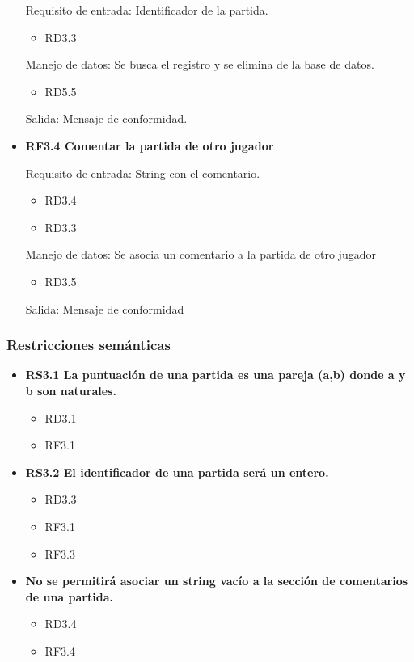 \begin{itemize}
	Requisito de entrada: Identificador de la partida.
	\begin{itemize}
		\item RD3.3
	\end{itemize}

	Manejo de datos: Se busca el registro y se elimina de la base de datos. \\
	\begin{itemize}
		\item RD5.5
	\end{itemize}

	Salida: Mensaje de conformidad. \\

	\item \textbf{RF3.4 Comentar la partida de otro jugador}

	Requisito de entrada: String con el comentario.
	\begin{itemize}
		\item RD3.4
		\item RD3.3
	\end{itemize}

	Manejo de datos: Se asocia un comentario a la partida de otro jugador
	\begin{itemize}
		\item RD3.5
	\end{itemize}

	Salida: Mensaje de conformidad \\

\end{itemize}

	\subsubsection{Restricciones semánticas}

	\begin{itemize}
		\item \textbf{RS3.1 La puntuación de una partida es una pareja (a,b) donde a y b son naturales.}
			\begin{itemize}
				\item RD3.1
				\item RF3.1
			\end{itemize}
		\item \textbf{RS3.2 El identificador de una partida será un entero.}
			\begin{itemize}
				\item RD3.3
				\item RF3.1
				\item RF3.3
			\end{itemize}

		\item \textbf{No se permitirá asociar un string vacío a la sección de comentarios de una partida.}
		\begin{itemize}
			\item RD3.4
			\item RF3.4
		\end{itemize}
	\end{itemize}
